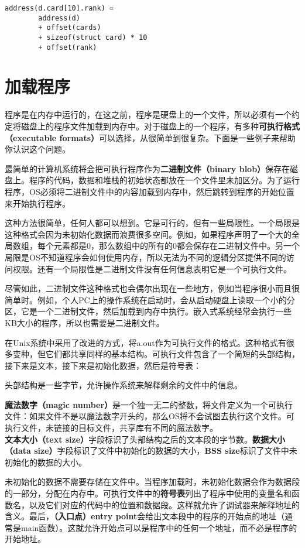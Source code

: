 \documentclass[cn,11pt,chinese]{elegantbook}
\begin{document}
\begin{verbatim}
address(d.card[10].rank) =
        address(d)
        + offset(cards)
        + sizeof(struct card) * 10
        + offset(rank)
\end{verbatim}

\section{加载程序}

程序是在内存中运行的，在这之前，程序是硬盘上的一个文件，所以必须有一个约定将磁盘上的程序文件加载到内存中。对于磁盘上的一个程序，有多种\textbf{可执行格式（executable formats）}可以选择，从很简单到很复杂。下面是一些例子来帮助你认识这个问题。

最简单的计算机系统将会把可执行程序作为\textbf{二进制文件（binary blob）}保存在磁盘上。程序的代码，数据和堆栈的初始状态都放在一个文件里未加区分。为了运行程序，OS必须将二进制文件中的内容加载到内存中，然后跳转到程序的开始位置来开始执行程序。

这种方法很简单，任何人都可以想到。它是可行的，但有一些局限性。一个局限是这种格式会因为未初始化数据而浪费很多空间。例如，如果程序声明了一个大的全局数组，每个元素都是0，那么数组中的所有的0都会保存在二进制文件中。另一个局限是OS不知道程序会如何使用内存，所以无法为不同的逻辑分区提供不同的访问权限。还有一个局限性是二进制文件没有任何信息表明它是一个可执行文件。

尽管如此，二进制文件这种格式也会偶尔出现在一些地方，例如当程序很小而且很简单时。例如，个人PC上的操作系统在启动时，会从启动硬盘上读取一个小的分区，它是一个二进制文件，然后加载到内存中执行。嵌入式系统经常会执行一些KB大小的程序，所以也需要是二进制文件。

在Unix系统中采用了改进的方式，将a.out作为可执行文件的格式。这种格式有很多变种，但它们都共享同样的基本结构。可执行文件包含了一个简短的头部结构，接下来是文本，接下来是初始化数据，然后是符号表：

头部结构是一些字节，允许操作系统来解释剩余的文件中的信息。

\textbf{魔法数字（magic number）}是一个独一无二的整数，将文件定义为一个可执行文件：如果文件不是以魔法数字开头的，那么OS将不会试图去执行这个文件。可执行文件，未链接的目标文件，共享库有不同的魔法数字。\textbf{文本大小（text size）}字段标识了头部结构之后的文本段的字节数。\textbf{数据大小（data size）}字段标识了文件中初始化的数据的大小，\textbf{BSS size}标识了文件中未初始化的数据的大小。

未初始化的数据不需要存储在文件中。当程序加载时，未初始化数据会作为数据段的一部分，分配在内存中。可执行文件中的\textbf{符号表}列出了程序中使用的变量名和函数名，以及它们对应的代码中的位置和数据段。这样就允许了调试器来解释地址的含义。最后，\textbf{（入口点）entry point}会给出文本段中的程序的开始点的地址（通常是main函数）。这就允许开始点可以是程序中的任何一个地址，而不必是程序的开始地址。
\end{document}
